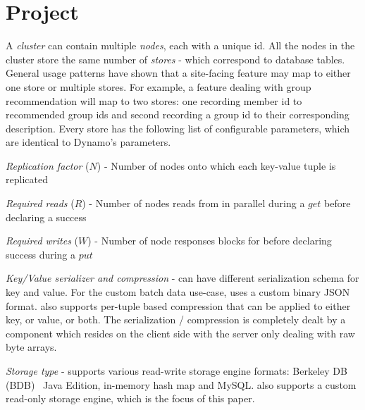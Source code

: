 \section{Project \projectname{}}
\label{sec:system_architecture}

A \projectname{} \emph{cluster} can contain multiple \emph{nodes}, each with a unique id. All the nodes in the cluster store the same number of \emph{stores} - which correspond to database tables. General usage patterns have shown that a site-facing feature may map to either one store or multiple stores. For example, a feature dealing with group recommendation will map to two stores: one recording member id to recommended group ids and second recording a group id to their corresponding description. Every store has the following list of configurable parameters, which are identical to Dynamo's parameters. 
\begin{compactitem}
	\item \emph {Replication factor} ($N$) - Number of nodes onto which each key-value tuple is replicated
	\item \emph {Required reads} ($R$) - Number of nodes \projectname{} reads from in parallel during a $get$ before declaring a success
	\item \emph {Required writes} ($W$) - Number of node responses \projectname{} blocks for before declaring success during a $put$
	\item \emph {Key/Value serializer and compression} - \projectname{} can have different serialization schema for key and value. For the custom batch data use-case, \projectname{} uses a custom binary JSON format. \projectname{} also supports per-tuple based compression that can be applied to either key, or value, or both. The serialization / compression is completely dealt by a component which resides on the client side with the server only dealing with raw byte arrays. 
	\item \emph {Storage type} - \projectname{} supports various read-write storage engine formats: Berkeley DB (BDB)~\cite{bdb} Java Edition, in-memory hash map and MySQL. \projectname{} also supports a custom read-only storage engine, which is the focus of this paper.  
\end{compactitem}

